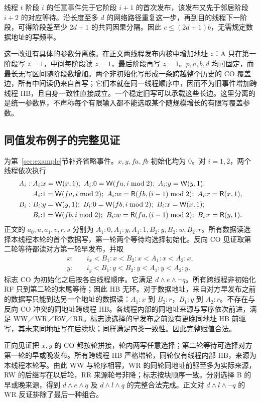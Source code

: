 线程 $t$ 阶段 $i$ 的任意事件先于它阶段 $i+1$ 的首次发布，该发布又先于邻居阶段 $i+2$ 的对应等待。沿长度至多 $d$ 的网络路径重复这一步，再到目的线程下一阶段，可得阶段差至少 $2d+1$ 的共同因果分隔。因此 $c\le(2d+1)b$，无需规定数据地址的写频率。

这一改进有具体的参数分离族。在正文两线程发布内核中增加地址 $z$：A 只在第一阶段写 $z=1$，中间每阶段读 $z=1$，最后阶段再写 $z=1$。$p,a,b,d$ 均可固定，而最长无写区间随阶段数增加。两个非初始化写形成一条跨越整个历史的 CO 覆盖边，所有中间读仍来自首写；它们本就在同一线程顺序中，因而不为旧事件增加跨线程 HB，且自身一致性直接成立。一个稳定旧写可以承载这些长边。这里分离的是统一参数界，不声称每个有限输入都不能选取某个随规模增长的有限写覆盖参数。

\subsection{同值发布例子的完整见证}\label{app:witness}
为第~\ref{sec:example}节补齐省略事件。$x,y,fa,fb$ 初始化均为 $0$。对 $i=1,2$，两个线程依次执行
\begin{align*}
 A_i:\ &A_i{:}x=\W(x,1);\ A_i{:}0=\W(fa,i\bmod2);\ A_i{:}y=\W(y,1);\\
        &A_i{:}1=\W(fa,i\bmod2);\ A_i{:}w=\R(fb,(i-1)\bmod2);\ A_i{:}r=\R(x,1),\\
 B_i:\ &B_i{:}y=\W(y,1);\ B_i{:}0=\W(fb,i\bmod2);\ B_i{:}x=\W(x,1);\\
        &B_i{:}1=\W(fb,i\bmod2);\ B_i{:}w=\R(fa,(i-1)\bmod2);\ B_i{:}r=\R(y,1).
\end{align*}
正文的 $a_0,u,a_1,v,r,s$ 分别为 $A_1{:}0,A_1{:}y,A_1{:}1,B_2{:}y,B_2{:}w,B_2{:}r$。所有数据读选择本线程本轮的首个数据写，第一轮两个等待均选择初始化。反向 CO 见证取第二轮等待都读对方第一轮早发布，并取
\begin{align*}
 x:&\quad i_x<B_1{:}x<B_2{:}x<A_1{:}x<A_2{:}x,\\
 y:&\quad i_y<B_1{:}y<B_2{:}y<A_1{:}y<A_2{:}y.
\end{align*}
标志 CO 为初始化之后按各自线程顺序。它满足 $d\land e\land\neg q$。所有跨线程非初始化 RF 只到第二轮的末尾等待；因此 HB 无环。对于数据地址，来自对方早发布之前的数据写只能到达另一个地址的数据读：$A_1{:}x$ 到 $B_2{:}r$，$B_1{:}y$ 到 $A_2{:}r$。不存在与反向 CO 冲突的同地址跨线程 HB。各线程内部的同地址来源与写序依次前进，满足 WW／WR／RW／RR。标志读选择的早发布之前没有更晚同地址 HB 前驱写，其未来同地址写在后续块；同样满足四类一致性。因此完整赋值合法。

正向见证把 $x,y$ 的 CO 都按轮拼接，轮内两写任意选择；第二轮等待可选择对方第一轮的早或晚发布。所有跨线程 HB 严格增轮，同轮仅有线程内部 HB，来源为本线程本轮写。由此 WW 与轮序相容，WR 的同轮同地址前驱至多为实际来源，RW 的后继写在以后轮，RR 来源轮号非降；标志按块顺序一致。分别选择 B 的早或晚来源，得到 $d\land e\land q$ 及 $d\land l\land q$ 的完整合法完成。正文对 $d\land l\land\neg q$ 的 WR 反证排除了最后一种组合。
